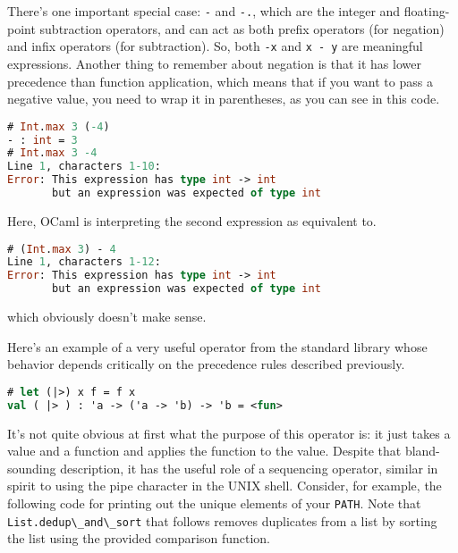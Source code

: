 There's one important special case: \passthrough{\lstinline!-!} and
\passthrough{\lstinline!-.!}, which are the integer and floating-point
subtraction operators, and can act as both prefix operators (for
negation) and infix operators (for subtraction). So, both
\passthrough{\lstinline!-x!} and \passthrough{\lstinline!x - y!} are
meaningful expressions. Another thing to remember about negation is that
it has lower precedence than function application, which means that if
you want to pass a negative value, you need to wrap it in parentheses,
as you can see in this code.

\begin{lstlisting}[language=Caml]
# Int.max 3 (-4)
- : int = 3
# Int.max 3 -4
Line 1, characters 1-10:
Error: This expression has type int -> int
       but an expression was expected of type int
\end{lstlisting}

Here, OCaml is interpreting the second expression as equivalent to.

\begin{lstlisting}[language=Caml]
# (Int.max 3) - 4
Line 1, characters 1-12:
Error: This expression has type int -> int
       but an expression was expected of type int
\end{lstlisting}

which obviously doesn't make sense.

Here's an example of a very useful operator from the standard library
whose behavior depends critically on the precedence rules described
previously.

\begin{lstlisting}[language=Caml]
# let (|>) x f = f x
val ( |> ) : 'a -> ('a -> 'b) -> 'b = <fun>
\end{lstlisting}

It's not quite obvious at first what the purpose of this operator is: it
just takes a value and a function and applies the function to the value.
Despite that bland-sounding description, it has the useful role of a
sequencing operator, similar in spirit to using the pipe character in
the UNIX shell. Consider, for example, the following code for printing
out the unique elements of your \passthrough{\lstinline!PATH!}. Note
that \passthrough{\lstinline!List.dedup\_and\_sort!} that follows
removes duplicates from a list by sorting the list using the provided
comparison function.

